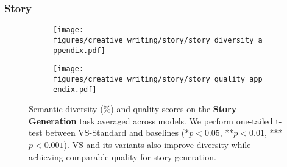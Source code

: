 \newpage
\subsubsection{Story} 

\begin{figure*}[!htbp]
  \centering
  \begin{subfigure}[t]{0.48\textwidth}
      \centering
      \texttt{[image: figures/creative\_writing/story/story\_diversity\_appendix.pdf]}
      \label{fig:story_creative_diversity}
  \end{subfigure}
  \hfill
  \begin{subfigure}[t]{0.48\textwidth}
      \centering
      \texttt{[image: figures/creative\_writing/story/story\_quality\_appendix.pdf]}
      \label{fig:story_creative_quality}
  \end{subfigure}
  \caption{
  Semantic diversity (\%) and quality scores on the \textbf{Story Generation} task averaged across models. We perform one-tailed t-test between VS-Standard and baselines (*$p < 0.05$, **$p < 0.01$, ***$p < 0.001$). VS and its variants also improve diversity while achieving comparable quality for story generation.
  }
  \label{fig:poem_continuation}
\end{figure*}



